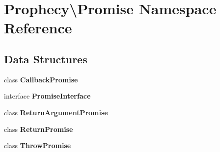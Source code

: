 \section{Prophecy\textbackslash{}Promise Namespace Reference}
\label{namespace_prophecy_1_1_promise}
\subsection*{Data Structures}
\begin{DoxyCompactItemize}
\item 
class {\bf Callback\+Promise}
\item 
interface {\bf Promise\+Interface}
\item 
class {\bf Return\+Argument\+Promise}
\item 
class {\bf Return\+Promise}
\item 
class {\bf Throw\+Promise}
\end{DoxyCompactItemize}
